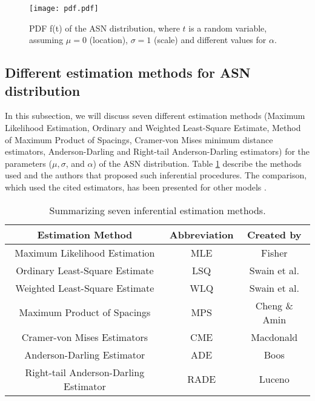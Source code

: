 \documentclass[]{interact}
\theoremstyle{plain}%
\theoremstyle{definition}
\theoremstyle{remark}
\begin{document}
\begin{figure}[tbh]
\centering
\texttt{[image: pdf.pdf]}
\caption{PDF f(t) of the ASN distribution, where $t$ is a random variable, assuming $\mu=0$ (location), $\sigma=1$ (scale) and different values for $\alpha$.}
\label{fcv}
\end{figure}


\subsection{Different estimation methods for ASN distribution}

In this subsection, we will discuss seven different estimation methods (Maximum Likelihood Estimation, Ordinary and Weighted Least-Square Estimate, Method of Maximum Product of Spacings, Cramer-von Mises minimum distance estimators, Anderson-Darling and Right-tail Anderson-Darling estimators) for the parameters ($\mu, \sigma$, and $\alpha$) of the ASN distribution. Table \ref{TAB:methods} describe the methods used and the authors that proposed such inferential procedures. The comparison, which used the cited estimators, has been presented for other models \cite{deyramos2017, ramoslouzadab2018, teimouri}. 

\begin{table}[htbp]
\centering
\caption{Summarizing seven inferential estimation methods.}
\begin{adjustbox}{width=1\textwidth}
\small
\begin{tabular}{c|c|c}
\hline
\textbf{Estimation Method} & \textbf{Abbreviation} & \textbf{Created by} \\ \hline
Maximum Likelihood Estimation & MLE & Fisher \cite{fisher1922mathematical} \\ \hline
Ordinary Least-Square Estimate & LSQ & Swain et al. \cite{swain1988least}  \\ \hline
Weighted Least-Square Estimate & WLQ & Swain et al. \cite{swain1988least} \\ \hline
Maximum Product of Spacings & MPS & Cheng \& Amin \cite{cheng1979maximum} \\ \hline
Cramer-von Mises Estimators & CME & Macdonald \cite{macdonald1971estimation} \\ \hline
Anderson-Darling Estimator & ADE & Boos \cite{boos1982minimum}   \\ \hline
Right-tail Anderson-Darling Estimator & RADE & Luceno \cite{luceno2006fitting} \\ \hline
\end{tabular}
\end{adjustbox}
\label{TAB:methods}
\end{table}
\end{document}
